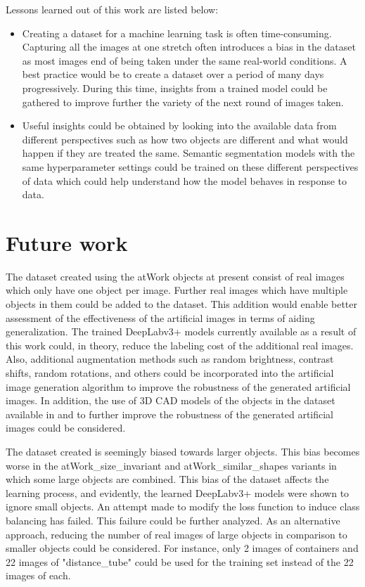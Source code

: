 Lessons learned out of this work are listed below:
	\begin{itemize}
		\item Creating a dataset for a machine learning task is often time-consuming. Capturing all the images at one stretch often introduces a bias in the dataset as most images end of being taken under the same real-world conditions. A best practice would be to create a dataset over a period of many days progressively. During this time, insights from a trained model could be gathered to improve further the variety of the next round of images taken.
		\item Useful insights could be obtained by looking into the available data from different perspectives such as how two objects are different and what would happen if they are treated the same. Semantic segmentation models with the same hyperparameter settings could be trained on these different perspectives of data which could help understand how the model behaves in response to data.
	\end{itemize}

\section{Future work}

The dataset created using the atWork objects at present consist of real images which only have one object per image. Further real images which have multiple objects in them could be added to the dataset. This addition would enable better assessment of the effectiveness of the artificial images in terms of aiding generalization. The trained DeepLabv3+ models currently available as a result of this work could, in theory, reduce the labeling cost of the additional real images. Also, additional augmentation methods such as random brightness, contrast shifts, random rotations, and others could be incorporated into the artificial image generation algorithm to improve the robustness of the generated artificial images. In addition, the use of 3D CAD models of the objects in the dataset available in \cite{atwork_models} and \cite{atwork_models_rockin} to further improve the robustness of the generated artificial images could be considered.

The dataset created is seemingly biased towards larger objects. This bias becomes worse in the atWork\_size\_invariant and atWork\_similar\_shapes variants in which some large objects are combined. This bias of the dataset affects the learning process, and evidently, the learned DeepLabv3+ models were shown to ignore small objects. An attempt made to modify the loss function to induce class balancing has failed. This failure could be further analyzed. As an alternative approach, reducing the number of real images of large objects in comparison to smaller objects could be considered. For instance, only 2 images of containers and 22 images of "distance\_tube" could be used for the training set instead of the 22 images of each.

